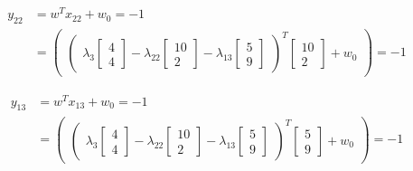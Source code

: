 \documentclass[12pt]{report}
\begin{document}
\begin{equation*}
	\begin{aligned}
		y_{22} & =  w^T x_{22} + w_{0} = -1          \\
		       & = \begin{pmatrix}
			           \begin{pmatrix}
				\lambda_{3}\begin{bmatrix}
					           4 \\
					           4
				           \end{bmatrix} -

				\lambda_{22}\begin{bmatrix}
					            10 \\
					            2
				            \end{bmatrix}
				-

				\lambda_{13}\begin{bmatrix}
					            5 \\
					            9
				            \end{bmatrix}\end{pmatrix}  ^ T
			           \begin{bmatrix}
				10 \\
				2
			\end{bmatrix} + w_{0}
		           \end{pmatrix} = -1
	\end{aligned}
\end{equation*}

\begin{equation*}
	\begin{aligned}
		y_{13} & =  w^T x_{13} + w_{0} = -1          \\
		       & = \begin{pmatrix}
			           \begin{pmatrix}
				\lambda_{3}\begin{bmatrix}
					           4 \\
					           4
				           \end{bmatrix} -

				\lambda_{22}\begin{bmatrix}
					            10 \\
					            2
				            \end{bmatrix}
				-

				\lambda_{13}\begin{bmatrix}
					            5 \\
					            9
				            \end{bmatrix}\end{pmatrix}  ^ T
			           \begin{bmatrix}
				5 \\
				9
			\end{bmatrix} + w_{0}
		           \end{pmatrix} = -1
	\end{aligned}
\end{equation*}
\end{document}
